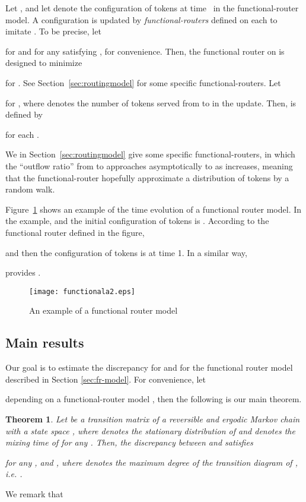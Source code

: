 \documentclass[letter, 11pt]{article}
\newcommand{\1}{\mbox{1}\hspace{-0.25em}\mbox{l}}
\newtheorem{theorem}{Theorem}[section]
\begin{document}
Let , and 
 let  denote the configuration of tokens 
   at time~ in the functional-router model. 
 A configuration  
   is updated by {\em functional-routers} 
    defined on each  
  to imitate . 
To be precise, let

for  and for any  satisfying , 
  for convenience. 
 Then, the functional router  on  is designed to minimize 

 for . 
See Section~\ref{sec:routingmodel} for some specific functional-routers. 
Let

  for , 
 where  denotes the number of tokens served from  to  in the update. 
 Then,  is defined by 

 for each . 

We in Section~\ref{sec:routingmodel} give some specific functional-routers, 
  in which the ``outflow ratio'' 
    from  to  
 approaches asymptotically to  as  increases, 
 meaning that the functional-router hopefully approximate a distribution of tokens by a random walk. 


Figure~\ref{fig:one} shows an example of the time evolution of a functional router model. 
 In the example,  and the initial configuration of tokens is . 
 According to the functional router  defined in the figure, 

and then the configuration of tokens is  at time 1.  
 In a similar way, 

  provides . 
\begin{figure}[t]
 \begin{center}
  \texttt{[image: functionala2.eps]}
 \end{center}
 \caption{An example of a functional router model}
 \label{fig:one}
\end{figure}



\subsection{Main results}\label{subsec:main_results}
Our goal is to estimate the discrepancy  
for  and  for the functional router model described in Section \ref{sec:fr-model}. 
For convenience, let 

depending on a functional-router model , then the following is our main theorem. 
\begin{theorem}
\label{thm:mixupper-vertexds}
 Let  be a transition matrix of 
  a {\em reversible} and ergodic Markov chain with a state space , where  denotes the stationary distribution of  and  denotes the mixing time of  for any . 
Then, the discrepancy between  and  satisfies

for any ,  and , where  denotes the maximum degree of the transition diagram of , {\rm i.e.} . 
\end{theorem}
We remark that 
\end{document}
